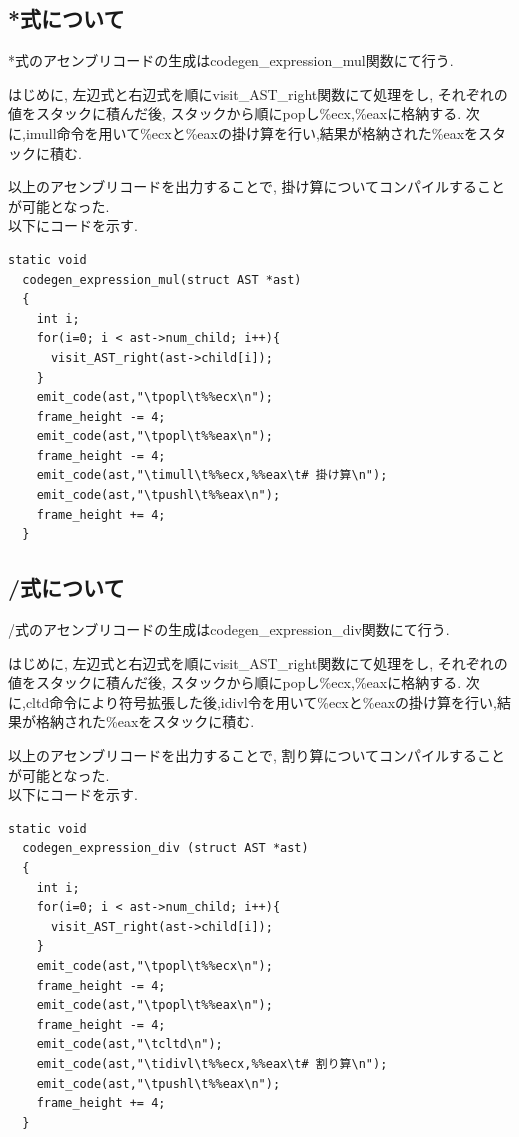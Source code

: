 \documentclass[10pt]{jsarticle}
\begin{document}
\subsection{*式について}
*式のアセンブリコードの生成はcodegen\_expression\_mul関数にて行う.
\par はじめに, 左辺式と右辺式を順にvisit\_AST\_right関数にて処理をし, それぞれの値をスタックに積んだ後, スタックから順にpopし\%ecx,\%eaxに格納する. 次に,imull命令を用いて\%ecxと\%eaxの掛け算を行い,結果が格納された\%eaxをスタックに積む.
\par 以上のアセンブリコードを出力することで, 掛け算についてコンパイルすることが可能となった. \\
以下にコードを示す.
\begin{lstlisting}[caption=codegen\_expression\_mul]
  static void
  codegen_expression_mul(struct AST *ast)
  {
    int i;
    for(i=0; i < ast->num_child; i++){
      visit_AST_right(ast->child[i]);
    }
    emit_code(ast,"\tpopl\t%%ecx\n");
    frame_height -= 4;
    emit_code(ast,"\tpopl\t%%eax\n");
    frame_height -= 4;
    emit_code(ast,"\timull\t%%ecx,%%eax\t# 掛け算\n");
    emit_code(ast,"\tpushl\t%%eax\n");
    frame_height += 4;
  }
\end{lstlisting}

\subsection{/式について}
/式のアセンブリコードの生成はcodegen\_expression\_div関数にて行う.
\par はじめに, 左辺式と右辺式を順にvisit\_AST\_right関数にて処理をし, それぞれの値をスタックに積んだ後, スタックから順にpopし\%ecx,\%eaxに格納する. 次に,cltd命令により符号拡張した後,idivl令を用いて\%ecxと\%eaxの掛け算を行い,結果が格納された\%eaxをスタックに積む.
\par 以上のアセンブリコードを出力することで, 割り算についてコンパイルすることが可能となった. \\
以下にコードを示す.
\begin{lstlisting}[caption=codegen\_expression\_div]
  static void
  codegen_expression_div (struct AST *ast)
  {
    int i;
    for(i=0; i < ast->num_child; i++){
      visit_AST_right(ast->child[i]);
    }
    emit_code(ast,"\tpopl\t%%ecx\n");
    frame_height -= 4;
    emit_code(ast,"\tpopl\t%%eax\n");
    frame_height -= 4;
    emit_code(ast,"\tcltd\n");
    emit_code(ast,"\tidivl\t%%ecx,%%eax\t# 割り算\n");
    emit_code(ast,"\tpushl\t%%eax\n");
    frame_height += 4;
  }
\end{lstlisting}
\end{document}
